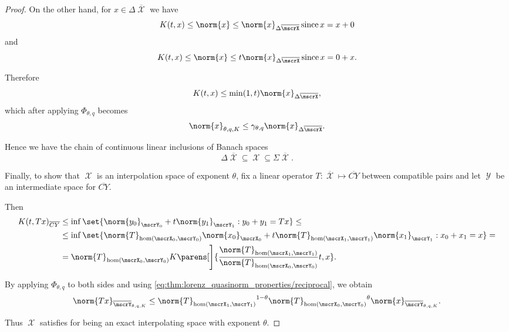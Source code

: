 \begin{proof}
  On the other hand, for \( x \in \Delta \overline{\mscrX} \) we have
  \begin{equation*}
    K(t, x) \leq \norm{x} \leq \norm{x}_{\Delta \overline{\mscrX}} \T{since} x = x + 0
  \end{equation*}
  and
  \begin{equation*}
    K(t, x) \leq \norm{x} \leq t \norm{x}_{\Delta \overline{\mscrX}} \T{since} x = 0 + x.
  \end{equation*}

  Therefore
  \begin{equation*}
    K(t, x) \leq \min(1, t) \norm{x}_{\Delta \overline{\mscrX}},
  \end{equation*}
  which after applying \( \Phi_{\theta,q} \) becomes
  \begin{equation*}
    \norm{x}_{\theta,q,K} \leq \gamma_{\theta,q} \norm{x}_{\Delta \overline{\mscrX}}.
  \end{equation*}

  Hence we have the chain of continuous linear inclusions of Banach spaces
  \begin{equation*}
    \Delta \overline{\mscrX} \subseteq \mscrX \subseteq \Sigma \overline{\mscrX}.
  \end{equation*}

  Finally, to show that \( \mscrX \) is an interpolation space of exponent \( \theta \), fix a linear operator \( T: \overline{\mscrX} \mapsto \overline{CY} \) between compatible pairs and let \( \mscrY \) be an intermediate space for \( \overline{CY} \).

  Then
  \begin{align*}
    K(t, Tx)_{\overline{CY}}
    &\leq
    \inf \set{ \norm{y_0}_{\mscrY_0} + t \norm{y_1}_{\mscrY_1} : y_0 + y_1 = Tx }
    \leq \\ &\leq
    \inf \set{ \norm{T}_{\hom(\mscrX_0, \mscrY_0)} \norm{x_0}_{\mscrX_0} + t \norm{T}_{\hom(\mscrX_1, \mscrY_1)} \norm{x_1}_{\mscrY_1} : x_0 + x_1 = x }
    = \\ &=
    \norm{T}_{\hom(\mscrX_0, \mscrY_0)} K\parens[\Bigg]{\frac {\norm{T}_{\hom(\mscrX_1, \mscrY_1)}} {\norm{T}_{\hom(\mscrX_0, \mscrY_0)}} t, x}.
  \end{align*}

  By applying \( \Phi_{\theta,q} \) to both sides and using \eqref{eq:thm:lorenz_quasinorm_properties/reciprocal}, we obtain
  \begin{equation*}
    \norm{Tx}_{\overline{\mscrY}_{\theta,q,K}}
    \leq
    {\norm{T}_{\hom(\mscrX_1, \mscrY_1)}}^{1 - \theta} {\norm{T}_{\hom(\mscrX_0, \mscrY_0)}}^{\theta} \norm{x}_{\overline{\mscrY}_{\theta,q,K}}.
  \end{equation*}

  Thus \( \mscrX \) satisfies  for being an exact interpolating space with exponent \( \theta \).
\end{proof}

